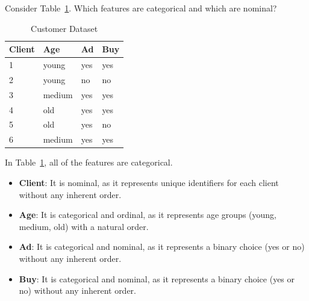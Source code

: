 \documentclass[12pt]{article}
\begin{document}
    \begin{ejercicio}
        Consider Table~\ref{tab:customer_dataset2}. Which features are categorical and which are nominal?

        \begin{table}[h!]
        \centering
        \begin{tabular}{|l|l|l|l|}
        \hline
        \textbf{Client} & \textbf{Age} & \textbf{Ad} & \textbf{Buy} \\ \hline
        1 & young & yes & yes \\ \hline
        2 & young & no & no \\ \hline
        3 & medium & yes & yes \\ \hline
        4 & old & yes & yes \\ \hline
        5 & old & yes & no \\ \hline
        6 & medium & yes & yes \\ \hline
        \end{tabular}
        \caption{Customer Dataset}
        \label{tab:customer_dataset2}
        \end{table}

        In Table~\ref{tab:customer_dataset2}, all of the features are categorical.
        \begin{itemize}
            \item \textbf{Client}: It is nominal, as it represents unique identifiers for each client without any inherent order.
            \item \textbf{Age}: It is categorical and ordinal, as it represents age groups (young, medium, old) with a natural order.
            \item \textbf{Ad}: It is categorical and nominal, as it represents a binary choice (yes or no) without any inherent order.
            \item \textbf{Buy}: It is categorical and nominal, as it represents a binary choice (yes or no) without any inherent order.
        \end{itemize}
    \end{ejercicio}
\end{document}
